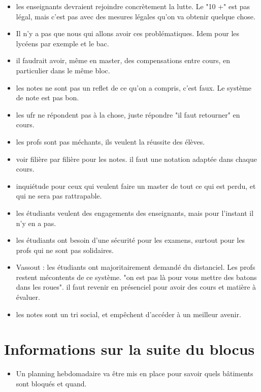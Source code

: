 \documentclass{article}
\begin{document}
\begin{itemize}
    \item les enseignants devraient rejoindre concrètement la lutte. Le "10 +" est pas légal, mais c'est pas avec des mesures légales qu'on va obtenir quelque chose.
    \item Il n'y a pas que nous qui allons avoir ces problématiques. Idem pour les lycéens par exemple et le bac.
    \item il faudrait avoir, même en master, des compensations entre cours, en particulier dans le même bloc.
    \item les notes ne sont pas un reflet de ce qu'on a compris, c'est faux. Le système de note est pas bon.
    \item les ufr ne répondent pas à la chose, juste répondre "il faut retourner" en cours. 
    \item les profs sont pas méchants, ils veulent la réussite des élèves.
    \item voir filière par filière pour les notes. il faut une notation adaptée dans chaque cours.
    \item inquiétude pour ceux qui veulent faire un master de tout ce qui est perdu, et qui ne sera pas rattrapable.
    \item les étudiants veulent des engagements des enseignants, mais pour l'instant il n'y en a pas.
    \item les étudiants ont besoin d'une sécurité pour les examens, surtout pour les profs qui ne sont pas solidaires.
    \item Vassout : les étudiants ont majoritairement demandé du distanciel. Les profs restent mécontents de ce système. "on est pas là pour vous mettre des batons dans les roues". il faut revenir en présenciel pour avoir des cours et matière à évaluer.
    \item les notes sont un tri social, et empêchent d'accéder à un meilleur avenir. 
\end{itemize}

\section{Informations sur la suite du blocus}

\begin{itemize}
    \item Un planning hebdomadaire va être mis en place pour savoir quels bâtiments sont bloqués et quand.
\end{itemize}
\end{document}
